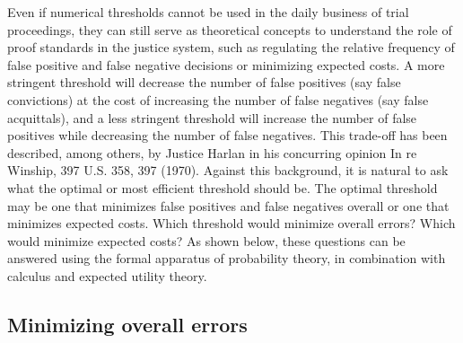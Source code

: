 \documentclass{article}
\begin{document}
Even if numerical thresholds cannot be used in the daily business of trial proceedings, they
can still serve as theoretical concepts to understand the role of proof standards in the justice system, such as regulating the relative frequency of false positive and false negative decisions or minimizing expected costs.
A more stringent threshold will decrease the number of false positives (say false convictions) at the cost of increasing the number of false negatives (say false acquittals), and a less stringent threshold will increase the number of false positives while decreasing the number of false negatives.
This trade-off has been described, among others, by Justice Harlan in his concurring opinion In re Winship, 397 U.S. 358, 397 (1970).  Against this background, it is natural to ask what the optimal or most efficient threshold should be. The optimal threshold may be one that minimizes false positives and false negatives overall or one that minimizes expected costs. Which threshold would minimize overall errors? Which would minimize expected costs?
As shown below, these questions 
can be answered using the formal apparatus of probability theory, in combination with calculus and expected utility theory.



\subsection{Minimizing overall errors}
\end{document}
